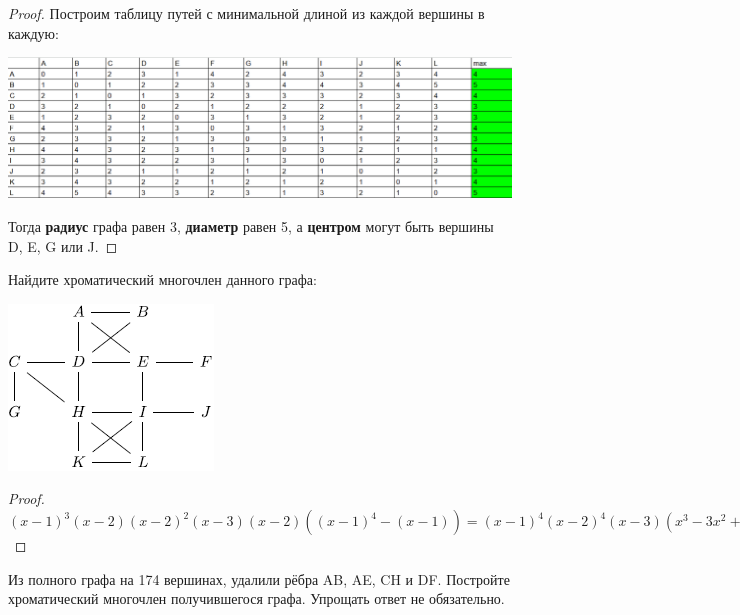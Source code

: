 \begin{proof}
    Построим таблицу путей с минимальной длиной из каждой вершины в каждую:

     \centering\includegraphics[width=1.1\linewidth]{pics/10ThSolution.png}
    
    Тогда \textbf{радиус} графа равен 3, \textbf{диаметр} равен 5, а \textbf{центром} могут быть вершины D, E, G или J.

\end{proof}

\begin{problem}[11]

	Найдите хроматический многочлен данного графа:
    
    \centering\includegraphics[width=0.4\linewidth]{pics/11ThGraph.png}
    
\end{problem}

\begin{proof}

    $(x-1)^{3}(x-2)(x-2)^{2}(x-3)(x-2)((x-1)^{4}-(x-1)) = (x-1)^{4}(x-2)^{4}(x-3)(x^{3}-3x^{2}+3x-1+1) = x(x-1)^{4}(x-2)^{4}(x-3)(x^{2}-3x+3)$

\end{proof}

\begin{problem}[12]

	Из полного графа на 174 вершинах, удалили рёбра AB, AE, CH и DF. Постройте хроматический многочлен получившегося графа. Упрощать ответ не обязательно.
    
\end{problem}

